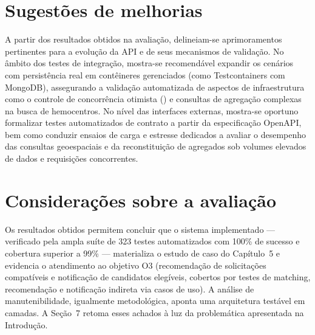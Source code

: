 \section{Sugestões de melhorias}

A partir dos resultados obtidos na avaliação, delineiam-se aprimoramentos pertinentes para a evolução da API e de seus mecanismos de validação. No âmbito dos testes de integração, mostra-se recomendável expandir os cenários com persistência real em contêineres gerenciados (como Testcontainers com MongoDB), assegurando a validação automatizada de aspectos de infraestrutura como o controle de concorrência otimista () e consultas de agregação complexas na busca de hemocentros. No nível das interfaces externas, mostra-se oportuno formalizar testes automatizados de contrato a partir da especificação OpenAPI, bem como conduzir ensaios de carga e estresse dedicados a avaliar o desempenho das consultas geoespaciais e da reconstituição de agregados sob volumes elevados de dados e requisições concorrentes.

\section{Considerações sobre a avaliação}

Os resultados obtidos permitem concluir que o sistema implementado --- verificado pela ampla suíte de 323 testes automatizados com 100\% de sucesso e cobertura superior a 99\% --- materializa o estudo de caso do Capítulo~5 e evidencia o atendimento ao objetivo O3 (recomendação de solicitações compatíveis e notificação de candidatos elegíveis, cobertos por testes de matching, recomendação e notificação indireta via casos de uso). A análise de manutenibilidade, igualmente metodológica, aponta uma arquitetura testável em camadas. A Seção~7 retoma esses achados à luz da problemática apresentada na Introdução.
